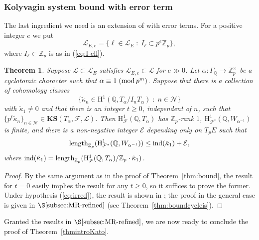 \documentclass[10pt,reqno]{amsart}
\numberwithin{equation}{section}
\theoremstyle{plain}
\newtheorem{thm}{Theorem}[subsection] %
\theoremstyle{definition}
\theoremstyle{definition}
\theoremstyle{plain}
\theoremstyle{plain}
\theoremstyle{plain}
\theoremstyle{plain}
\theoremstyle{plain}
\theoremstyle{plain}
\newcommand{\ind}{\operatorname{ind}}
\newcommand{\Z}{\mathbb{Z}}
\newcommand{\Q}{\mathbb{Q}}
\newcommand{\Zp}{\mathbb{Z}_{p}}
\newcommand{\Fcal}{\mathcal{F}}
\newcommand{\cL}{\mathcal{L}}
\newcommand{\rH}{\mathrm{H}}
\begin{document}
\subsubsection{Kolyvagin system bound with error term}\label{ss, koly-error}

The last ingredient we need is an extension of \cite[Thm.~5.2.2]{mazrub} with error terms. For a positive integer $e$ we put
\[
\mathcal{L}_{E,e}=\{\ell\in\mathcal{L}_E\;:\;I_\ell\subset p^e\Z_p\},
\]
where $I_\ell\subset\Z_p$ is as in (\ref{eq:I-ell}).

\begin{thm}%
\label{thm:mazurrubin} 
Suppose $\cL\subset\cL_E$ satisfies $\cL_{E,e}\subset\cL$ for $e\gg 0$. Let $\alpha:\Gamma_\Q\rightarrow \Z_p^\times$ be a cyclotomic character such that $\alpha\equiv 1\;({\rm mod}\,p^m)$. Suppose that there is a collection of cohomology classes
\[
\{\tilde{\kappa}_n\in\rH^1(\Q,T_\alpha/I_nT_\alpha)\;:\;n\in\mathcal{N}\}
\]
with $\tilde{\kappa}_1\neq 0$ and that there is an integer $t\geq 0$, independent of $n$, such that $\{p^t\tilde{\kappa}_n\}_{n\in\mathcal{N}}\in{\mathbf{KS}}(T_\alpha,\Fcal,\mathcal{L})$. Then $\rH^1_{\Fcal}(\Q,T_\alpha)$ has $\Zp$-rank $1$, $\rH^1_{\Fcal^*}(\Q,W_{\alpha^{-1}})$ is finite,  and there is a non-negative integer $\mathcal{E}$ depending only on $T_pE$ %
such that 
\[
{\rm length}_{\Z_p}(\rH^1_{\Fcal^*}(\Q,W_{\alpha^{-1}}))\leq \ind(\tilde{\kappa}_1)+\mathcal{E},
\]
where $\ind(\tilde{\kappa}_1)={\rm length}_{\Zp}(\rH^1_{\Fcal}(\Q,T_{\alpha})/\Z_p\cdot\tilde{\kappa}_{1})$.
\end{thm}

\begin{proof}
By the same argument as in the proof of Theorem~\ref{thm:bound}, the result for $t=0$ easily implies the result for any $t\geq 0$, so it suffices to prove the former. Under hypothesis (\ref{eq:irred}), the result is shown  in \cite[Thm.~5.2.2]{mazrub}; 
the proof in the general case %
is given  in $\S\ref{subsec:MR-refined}$ (see Theorem~\ref{thm:boundcycleis}).
\end{proof}

Granted the results in $\S\ref{subsec:MR-refined}$, we are now ready to conclude the proof of Theorem~\ref{thmintroKato}.
\end{document}
